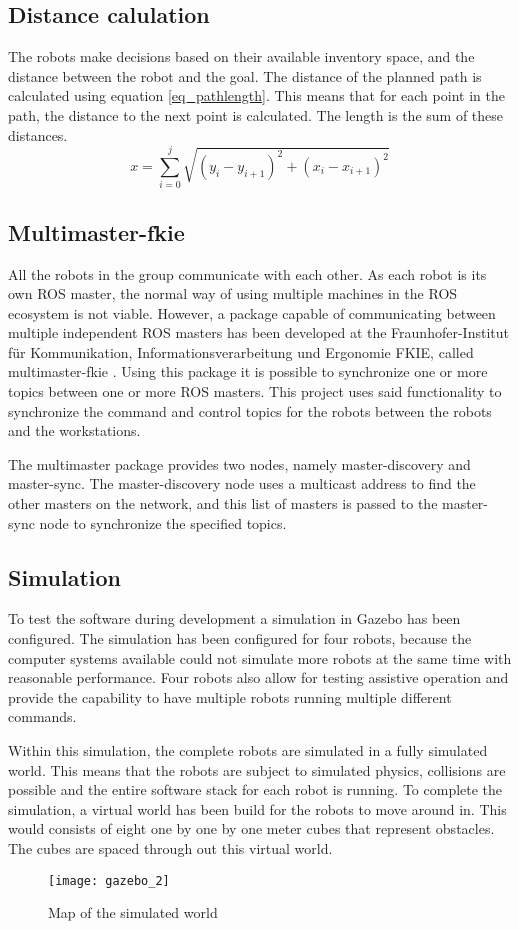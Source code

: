\documentclass[10pt, journal]{IEEEtran}
\begin{document}
\subsection{Distance calulation}
The robots make decisions based on their available inventory space, and the distance between the robot and the goal. The distance of the planned path is calculated using equation \ref{eq_pathlength}. This means that for each point in the path, the distance to the next point is calculated. The length is the sum of these distances.
\begin{equation}
\label{eq_pathlength}
x = \sum\limits_{i=0}^j \sqrt{(y_i - y_{i+1})^2 + (x_i - x_{i+1})^2}
\end{equation}

\subsection{Multimaster-fkie}
All the robots in the group communicate with each other. As each robot is its own ROS master, the normal\cite{ROSMultipleMachines} way of using multiple machines in the ROS ecosystem is not viable. However, a package capable of communicating between multiple independent ROS masters has been developed at the Fraunhofer-Institut für Kommunikation, Informationsverarbeitung und Ergonomie FKIE, called multimaster-fkie \cite{Multimaster-fkie}. Using this package it is possible to synchronize one or more topics between one or more ROS masters. This project uses said functionality to synchronize the command and control topics for the robots between the robots and the workstations.

The multimaster package provides two nodes, namely master-discovery and master-sync. The master-discovery node uses a multicast address to find the other masters on the network, and this list of masters is passed to the master-sync node to synchronize the specified topics.
\subsection{Simulation}
To test the software during development a simulation in Gazebo has been configured\cite{MultipleRobots}. The simulation has been configured for four robots, because the computer systems available could not simulate more robots at the same time with reasonable performance. Four robots also allow for testing assistive operation and provide the capability to have multiple robots running multiple different commands.

Within this simulation, the complete robots are simulated in a fully simulated world. This means that the robots are subject to simulated physics, collisions are possible and the entire software stack for each robot is running. To complete the simulation, a virtual world has been build for the robots to move around in. This would consists of eight one by one by one meter cubes that represent obstacles. The cubes are spaced through out this virtual world.
\begin{figure}[htp]
\centering
\texttt{[image: gazebo\_2]}
\caption{Map of the simulated world}
\label{SimulatedWorldMap}
\end{figure}
\end{document}
